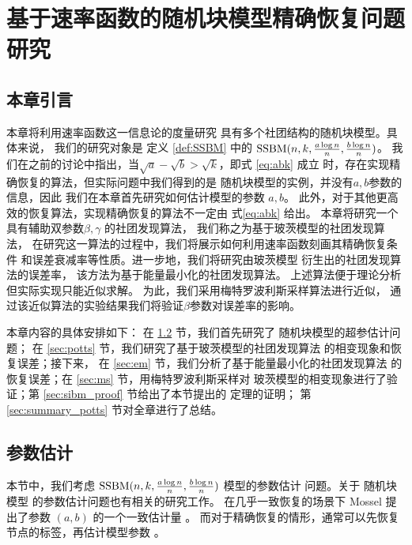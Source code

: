 
\chapter{基于速率函数的随机块模型精确恢复问题研究}\label{chap:sibm}
\section{本章引言}
本章将利用速率函数这一信息论的度量研究
具有多个社团结构的随机块模型。具体来说，
我们的研究对象是
定义 \ref{def:SSBM} 中的 $\operatorname{SSBM}(n,k,\frac{a \log n}{n}, \frac{b \log n}{n})$。
我们在之前的讨论中指出，当$\sqrt{a}-\sqrt{b}>\sqrt{k}$，即式 \eqref{eq:abk} 成立
时，存在实现精确恢复的算法，但实际问题中我们得到的是
随机块模型的实例，并没有$a,b$参数的信息，因此
我们在本章首先研究如何估计模型的参数 $a,b$。
此外，对于其他更高效的恢复算法，实现精确恢复的算法不一定由 式\eqref{eq:abk}
给出。
本章将研究一个具有辅助双参数$\beta,\gamma$ 的社团发现算法，
我们称之为基于玻茨模型的社团发现算法，
在研究这一算法的过程中，我们将展示如何利用速率函数刻画其精确恢复条件
和误差衰减率等性质。进一步地，我们将研究由玻茨模型
衍生出的社团发现算法的误差率，
该方法为基于能量最小化的社团发现算法。
上述算法便于理论分析但实际实现只能近似求解。
为此，我们采用梅特罗波利斯采样算法进行近似，
通过该近似算法的实验结果我们将验证$\beta$参数对误差率的影响。

本章内容的具体安排如下：
在 \ref{sec:parameter_estimation} 节，我们首先研究了
随机块模型的超参估计问题；
在 \ref{sec:potts} 节，我们研究了基于玻茨模型的社团发现算法
的相变现象和恢复误差；接下来，
在 \ref{sec:em} 节，我们分析了基于能量最小化的社团发现算法
的恢复误差；在 \ref{sec:ms} 节，用梅特罗波利斯采样对
玻茨模型的相变现象进行了验证；第 \ref{sec:sibm_proof} 节给出了本节提出的
定理的证明；
第 \ref{sec:summary_potts} 节对全章进行了总结。
\section{参数估计}\label{sec:parameter_estimation}


本节中，我们考虑 $\operatorname{SSBM}(n,k,\frac{a \log n}{n}, \frac{b \log n}{n})$ 模型的参数估计
问题。关于 随机块模型 的参数估计问题也有相关的研究工作。
在几乎一致恢复的场景下 Mossel 提出了参数 $(a,b)$ 的一个一致估计量
\cite{mossel2015reconstruction}。
而对于精确恢复的情形，通常可以先恢复节点的标签，再估计模型参数
\cite{abbe2015recovering}。

